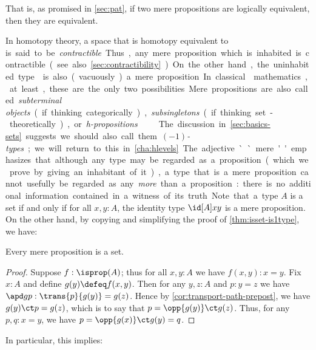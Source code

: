 That is, as promised in \cref{sec:pat}, if two mere propositions are logically equivalent, then they are equivalent.

In homotopy theory, a space that is homotopy equivalent to \unit is said to be \emph{contractible}.
Thus, any mere proposition which is inhabited is contractible (see also \cref{sec:contractibility}).
On the other hand, the uninhabited type \emptyt is also (vacuously) a mere proposition.
In classical mathematics, at least, these are the only two possibilities.

Mere propositions are also called \emph{subterminal objects} (if thinking categorically), \emph{subsingletons} (if thinking set-theoretically), or \emph{h-propositions}.
%
%
%
The discussion in \cref{sec:basics-sets} suggests we should also call them \emph{$(-1)$-types}; we will return to this in \cref{cha:hlevels}.
The adjective ``mere'' emphasizes that although any type may be regarded as a proposition (which we prove by giving an inhabitant of it), a type that is a mere proposition cannot usefully be regarded as any \emph{more} than a proposition: there is no additional information contained in a witness of its truth.

Note that a type $A$ is a set if and only if for all $x,y:A$, the identity type $\id[A]xy$ is a mere proposition.
On the other hand, by copying and simplifying the proof of \cref{thm:isset-is1type}, we have:

\begin{lem}\label{thm:prop-set}
  Every mere proposition is a set.
\end{lem}
\begin{proof}
  Suppose $f:\isprop(A)$; thus for all $x,y:A$ we have $f(x,y):x=y$.  Fix $x:A$
  and define $g(y)\defeq f(x,y)$.   Then for any $y,z:A$ and $p:y=z$ we have $\apd
  g p : \trans{p}{g(y)}={g(z)}$.  Hence by \cref{cor:transport-path-prepost}, we have
  $g(y)\ct p = g(z)$, which is to say that $p=\opp{g(y)}\ct g(z)$.  Thus, for
  any $p,q:x=y$, we have $p = \opp{g(x)}\ct g(y) = q$.
\end{proof}

In particular, this implies:

